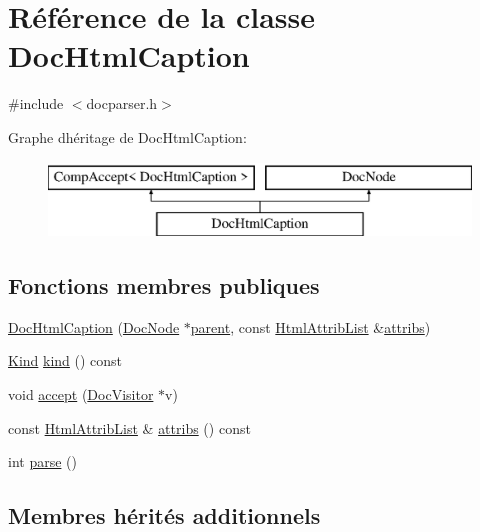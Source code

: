 \hypertarget{class_doc_html_caption}{}\section{Référence de la classe Doc\+Html\+Caption}
\label{class_doc_html_caption}


{\ttfamily \#include $<$docparser.\+h$>$}

Graphe d\textquotesingle{}héritage de Doc\+Html\+Caption\+:\begin{figure}[H]
\begin{center}
\leavevmode
\includegraphics[height=2.000000cm]{class_doc_html_caption}
\end{center}
\end{figure}
\subsection*{Fonctions membres publiques}
\begin{DoxyCompactItemize}
\item 
\hyperlink{class_doc_html_caption_aed6d882faf9ce3270760528422319bd1}{Doc\+Html\+Caption} (\hyperlink{class_doc_node}{Doc\+Node} $\ast$\hyperlink{class_doc_node_a990d8b983962776a647e6231d38bd329}{parent}, const \hyperlink{class_html_attrib_list}{Html\+Attrib\+List} \&\hyperlink{class_doc_html_caption_a8768da434de5f8a5e1b5f4dcdfbedbd7}{attribs})
\item 
\hyperlink{class_doc_node_aebd16e89ca590d84cbd40543ea5faadb}{Kind} \hyperlink{class_doc_html_caption_a20c637403279b29a285480892e22e8fe}{kind} () const 
\item 
void \hyperlink{class_doc_html_caption_a30adf37b8dff0fd708bd2dec5553f4b2}{accept} (\hyperlink{class_doc_visitor}{Doc\+Visitor} $\ast$v)
\item 
const \hyperlink{class_html_attrib_list}{Html\+Attrib\+List} \& \hyperlink{class_doc_html_caption_a8768da434de5f8a5e1b5f4dcdfbedbd7}{attribs} () const 
\item 
int \hyperlink{class_doc_html_caption_ab34c1c1fb268cd183992b15181e48013}{parse} ()
\end{DoxyCompactItemize}
\subsection*{Membres hérités additionnels}


